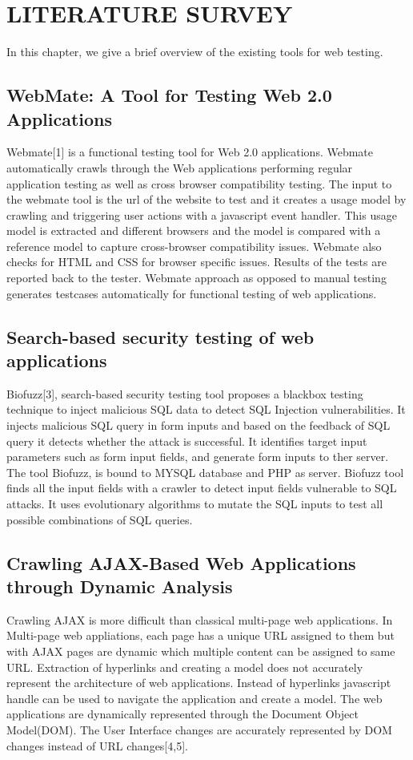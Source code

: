 \chapter{LITERATURE SURVEY}

In this chapter, we give a brief overview of the existing tools for web testing.

\section{WebMate: A Tool for Testing Web 2.0 Applications}

Webmate[1] is a functional testing tool for Web 2.0 applications. Webmate automatically crawls through the Web applications performing regular application testing as well as cross browser compatibility testing. The input to the webmate tool is the url of the website to test and it creates a usage model by crawling and triggering user actions with a javascript event handler. This usage model is extracted and different browsers and the model is compared with a reference model to capture cross-browser compatibility issues. Webmate also checks for HTML and CSS for browser specific issues. Results of the tests are reported back to the tester. Webmate approach as opposed to manual testing generates testcases automatically for functional testing of web applications. 

\section{Search-based security testing of web applications}

Biofuzz[3], search-based security testing tool proposes a blackbox testing technique to inject malicious SQL data to detect SQL Injection vulnerabilities. It injects malicious SQL query in form inputs and based on the feedback of SQL query it detects whether the attack is successful. It identifies target input parameters such as form input fields, and generate form inputs to ther server. The tool Biofuzz, is bound to MYSQL database and PHP as server. Biofuzz tool finds all the input fields with a crawler to detect input fields vulnerable to SQL attacks. It uses evolutionary algorithms to mutate the SQL inputs to test all possible combinations of SQL queries. 


\section{Crawling AJAX-Based Web Applications through Dynamic Analysis}
Crawling AJAX is more difficult than classical multi-page web applications. In Multi-page web appliations, each page has a unique URL assigned to them but with AJAX pages are dynamic which multiple content can be assigned to same URL. Extraction of hyperlinks and creating a model does not accurately represent the architecture of web applications. Instead of hyperlinks javascript handle can be used to navigate the application and create a model. The web applications are dynamically represented through the Document Object Model(DOM). The User Interface changes are accurately represented by DOM changes instead of URL changes[4,5].


